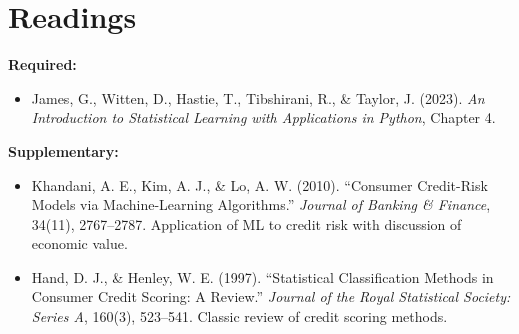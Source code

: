 \documentclass[11pt,a4paper]{article}
\begin{document}
\section*{Readings}

\textbf{Required:}
\begin{itemize}
    \item James, G., Witten, D., Hastie, T., Tibshirani, R., \& Taylor, J. (2023). \textit{An Introduction to Statistical Learning with Applications in Python}, Chapter 4.
\end{itemize}

\textbf{Supplementary:}
\begin{itemize}
    \item Khandani, A. E., Kim, A. J., \& Lo, A. W. (2010). ``Consumer Credit-Risk Models via Machine-Learning Algorithms.'' \textit{Journal of Banking \& Finance}, 34(11), 2767--2787. Application of ML to credit risk with discussion of economic value.
    \item Hand, D. J., \& Henley, W. E. (1997). ``Statistical Classification Methods in Consumer Credit Scoring: A Review.'' \textit{Journal of the Royal Statistical Society: Series A}, 160(3), 523--541. Classic review of credit scoring methods.
\end{itemize}

\end{document}
